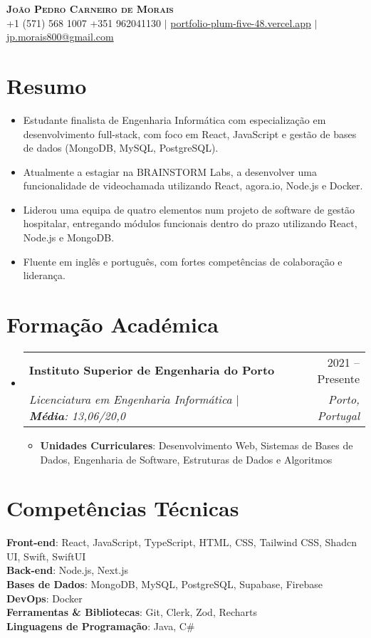 \documentclass[letterpaper,11pt]{article}
\makeatletter
\newcommand{\resumeItem}[1]{\item\small{#1 \vspace{-2pt}}}
\newcommand{\resumeSubheading}[4]{
  \vspace{-2pt}\item
    \begin{tabular*}{0.97\textwidth}[t]{l@{\extracolsep{\fill}}r}
      \textbf{#1} & #2 \\
      \textit{\small#3} & \textit{\small #4} \\
    \end{tabular*}\vspace{-7pt}
}
\newcommand{\resumeSubHeadingListStart}{\begin{itemize}[leftmargin=0.15in, label={}]}
\newcommand{\resumeSubHeadingListEnd}{\end{itemize}}
\newcommand{\resumeItemListStart}{\begin{itemize}}
\newcommand{\resumeItemListEnd}{\end{itemize}\vspace{-5pt}}
\makeatother
\begin{document}
\begin{center}
    \textbf{\Huge \scshape João Pedro Carneiro de Morais} \\ \vspace{1pt}
    \small +1 (571) 568 1007  +351 962041130 $|$ \href{https://portfolio-plum-five-48.vercel.app/}{portfolio-plum-five-48.vercel.app} $|$ \href{mailto:jp.morais800@gmail.com}{jp.morais800@gmail.com}
\end{center}

\section{Resumo}
  \resumeItemListStart
    \resumeItem{Estudante finalista de Engenharia Informática com especialização em desenvolvimento full-stack, com foco em React, JavaScript e gestão de bases de dados (MongoDB, MySQL, PostgreSQL).}
    \resumeItem{Atualmente a estagiar na BRAINSTORM Labs, a desenvolver uma funcionalidade de videochamada utilizando React, agora.io, Node.js e Docker.}
    \resumeItem{Liderou uma equipa de quatro elementos num projeto de software de gestão hospitalar, entregando módulos funcionais dentro do prazo utilizando React, Node.js e MongoDB.}
    \resumeItem{Fluente em inglês e português, com fortes competências de colaboração e liderança.}
  \resumeItemListEnd

\section{Formação Académica}
  \resumeSubHeadingListStart
    \resumeSubheading
      {Instituto Superior de Engenharia do Porto}{2021 -- Presente}
      {Licenciatura em Engenharia Informática $|$ \textbf{Média}: 13,06/20,0}
      {Porto, Portugal}
      \resumeItemListStart
        \resumeItem{\textbf{Unidades Curriculares}: Desenvolvimento Web, Sistemas de Bases de Dados, Engenharia de Software, Estruturas de Dados e Algoritmos}
      \resumeItemListEnd
  \resumeSubHeadingListEnd

\section{Competências Técnicas}
 \begin{itemize}[leftmargin=0.15in, label={}]
    \small{\item{
    {\textbf{Front-end}: React, JavaScript, TypeScript, HTML, CSS, Tailwind CSS, Shadcn UI, Swift, SwiftUI}\\
    {\textbf{Back-end}: Node.js, Next.js}\\
    {\textbf{Bases de Dados}: MongoDB, MySQL, PostgreSQL, Supabase, Firebase}\\
    {\textbf{DevOps}: Docker}\\
    {\textbf{Ferramentas \& Bibliotecas}: Git, Clerk, Zod, Recharts}\\
    {\textbf{Linguagens de Programação}: Java, C\#}}}
\end{itemize}
\end{document}
